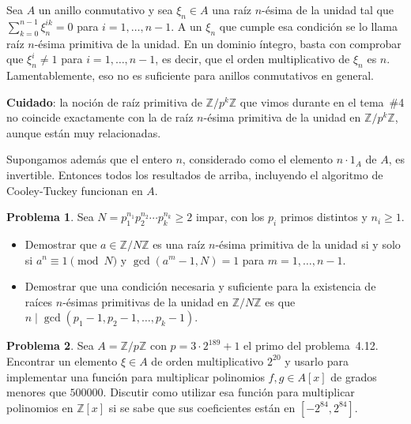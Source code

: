 \documentclass[a4paper, 11pt]{article}
\newcommand{\ZZ}{\mathbb{Z}}
\newcounter{numerodetema}
\theoremstyle{plain}
\theoremstyle{definition}
\newtheorem{prob}{Problema}[numerodetema]
\begin{document}
Sea $A$ un anillo conmutativo y sea $\xi_n\in A$ una raíz $n$-ésima
de la unidad tal que $\sum_{k=0}^{n-1}\xi_n^{ik}=0$ para $i=1,\ldots,n-1$.
A un $\xi_n$ que cumple esa condición se lo llama raíz $n$-ésima
primitiva de la unidad. En un dominio íntegro, basta con comprobar
que $\xi_n^i\neq 1$ para $i=1,\ldots,n-1$, es decir, que el orden
multiplicativo de $\xi_n$ es $n$. Lamentablemente, eso no es suficiente
para anillos conmutativos en general.

\bigskip

{\bf Cuidado}: la noción de raíz primitiva de $\ZZ/p^k\ZZ$ que
vimos durante en el tema~\#4
no coincide exactamente con la de raíz $n$-ésima primitiva de
la unidad en $\ZZ/p^k\ZZ$, aunque están muy relacionadas.

\bigskip

Supongamos además que el entero $n$, considerado como el elemento $n\cdot 1_A$
de $A$, es invertible. Entonces todos los resultados de arriba, incluyendo
el algoritmo de Cooley-Tuckey funcionan en $A$.

\begin{prob}
Sea $N=p_1^{n_1}p_2^{n_2}\cdots p_k^{n_k}\geq 2$ impar, con los $p_i$
primos distintos y $n_i\geq 1$.
\begin{itemize}
\item Demostrar que $a\in\ZZ/N\ZZ$ es una raíz $n$-ésima primitiva de
la unidad si y solo si $a^{n}\equiv1\pmod{N}$ y $\gcd(a^m-1,N)=1$ para
$m=1,\ldots,n-1$.
\item Demostrar que una condición necesaria y suficiente para la
existencia de raíces $n$-ésimas primitivas de la unidad en $\ZZ/N\ZZ$
es que $n\mid \gcd(p_1-1,p_2-1,\ldots,p_k-1)$.
\end{itemize}
\end{prob}

\begin{prob}
Sea $A=\ZZ/p\ZZ$ con $p=3\cdot 2^{189}+1$ el primo del problema~4.12.
Encontrar un elemento $\xi\in A$ de orden multiplicativo $2^{20}$ y usarlo
para implementar una función para multiplicar polinomios $f,g\in A[x]$ de
grados menores que $500000$. Discutir como utilizar esa función para
multiplicar polinomios en $\ZZ[x]$ si se sabe que sus coeficientes
están en $[-2^{84},2^{84}]$.
\end{prob}
\end{document}

